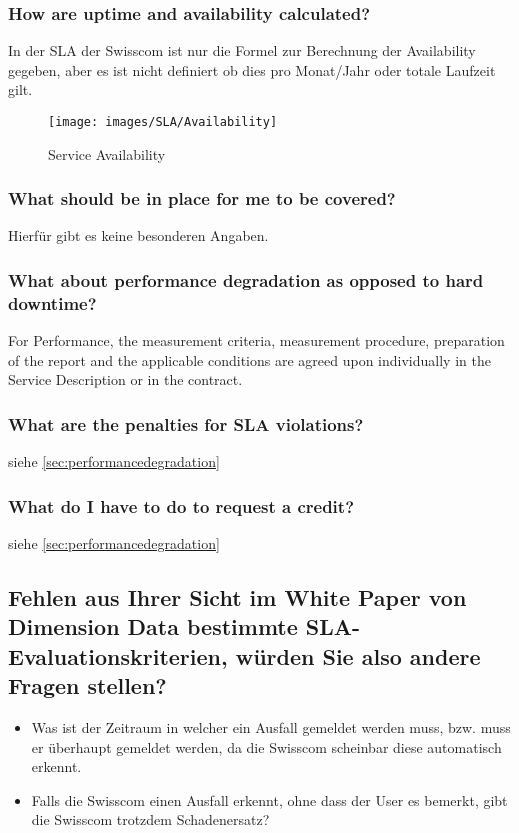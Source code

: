 \documentclass[11pt,titlepage]{article}
\begin{document}
\subsubsection{How are uptime and availability calculated?}
In der SLA der Swisscom ist nur die Formel zur Berechnung der Availability gegeben, aber es ist nicht definiert ob dies pro Monat/Jahr oder totale Laufzeit gilt.
\begin{figure}
	\centering
	\texttt{[image: images/SLA/Availability]}
	\caption{Service Availability}
	\label{fig:availability}
\end{figure}
\subsubsection{What should be in place for me to be covered?}
Hierfür gibt es keine besonderen Angaben.
\subsubsection{What about performance degradation as opposed to hard downtime?}
\label{sec:performancedegradation}
For Performance, the measurement criteria, measurement procedure, preparation of the report and the applicable conditions are agreed upon individually in the Service Description or in the contract.
\subsubsection{What are the penalties for SLA violations?}
siehe \autoref{sec:performancedegradation}
\subsubsection{What do I have to do to request a credit?}
siehe \autoref{sec:performancedegradation}
\subsection{Fehlen aus Ihrer Sicht im White Paper von Dimension Data bestimmte SLA-Evaluationskriterien, würden Sie also andere Fragen stellen?}
\begin{itemize}
	\item Was ist der Zeitraum in welcher ein Ausfall gemeldet werden muss, bzw. muss er überhaupt gemeldet werden, da die Swisscom scheinbar diese automatisch erkennt.
	\item Falls die Swisscom einen Ausfall erkennt, ohne dass der User es bemerkt, gibt die Swisscom trotzdem Schadenersatz?
\end{itemize}
\end{document}
